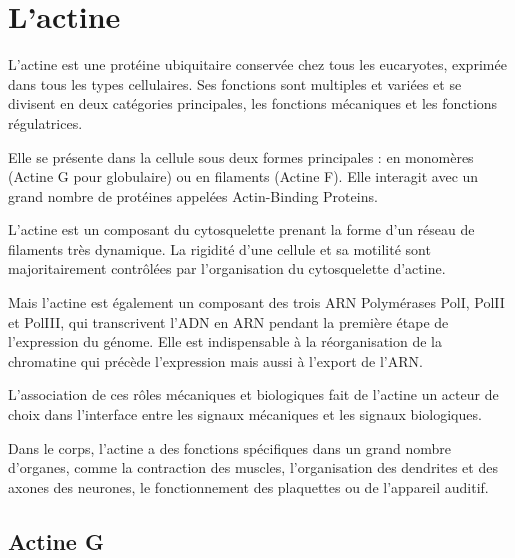 %
%
%

%
\chapter{L'actine}

L'actine est une protéine ubiquitaire conservée chez tous les eucaryotes, exprimée dans tous les types cellulaires. 
Ses fonctions sont multiples et variées et se divisent en deux catégories principales, les fonctions mécaniques et les fonctions régulatrices. 

Elle se présente dans la cellule sous deux formes principales : en monomères (Actine G pour globulaire) ou en filaments (Actine F). 
Elle interagit avec un grand nombre de protéines appelées Actin-Binding Proteins. 

L'actine est un composant du cytosquelette prenant la forme d'un réseau de filaments très dynamique. La rigidité d'une cellule et sa motilité sont majoritairement contrôlées par l'organisation du cytosquelette d'actine. 

Mais l'actine est également un composant des trois ARN Polymérases PolI, PolII et PolIII, qui transcrivent l'ADN en ARN pendant la première étape de l'expression du génome. 
Elle est indispensable à la réorganisation de la chromatine qui précède l'expression mais aussi à l'export de l'ARN.  

L'association de ces rôles mécaniques et biologiques fait de l'actine un acteur de choix dans l'interface entre les signaux mécaniques et les signaux biologiques. 

Dans le corps, l'actine a des fonctions spécifiques dans un grand nombre d'organes, comme la contraction des muscles, l'organisation des dendrites et des axones des neurones, le fonctionnement des plaquettes ou de l'appareil auditif. 



\section{Actine G}

